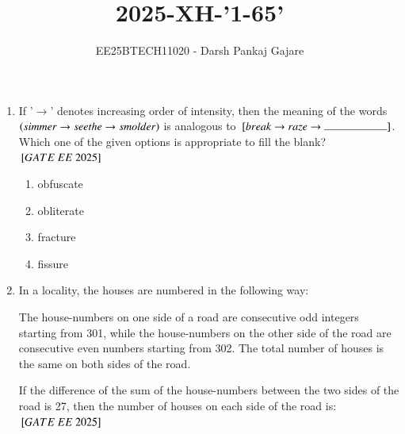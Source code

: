 \documentclass[journal,12pt,onecolumn]{IEEEtran}
\theoremstyle{remark}
\begin{document}
\title{2025-XH-'1-65'}
\author{EE25BTECH11020 - Darsh Pankaj Gajare}
\maketitle
\begin{enumerate}

\item If '$\rightarrow $' denotes increasing order of intensity, then the meaning of the words $\left(simmer \rightarrow  seethe \rightarrow  smolder\right)$ is analogous to $\sbrak{break \rightarrow  raze \rightarrow  \rule{2cm}{0.4pt} }$. Which one of the given options is appropriate to fill the blank? 
${}\left[GATE\ EE\ 2025\right]$\\
    \begin{enumerate}[label=(\Alph*)]
  \item obfuscate \\   
  \item obliterate \\
 \item fracture\\
  \item fissure \\  
  \end{enumerate}
   \item In a locality, the houses are numbered in the following way:

The house-numbers on one side of a road are consecutive odd integers starting from 301, while the house-numbers on the other side of the road are consecutive even numbers starting from 302. The total number of houses is the same on both sides of the road.

If the difference of the sum of the house-numbers between the two sides of the road is 27, then the number of houses on each side of the road is: \\
   ${}\left[GATE\ EE\ 2025\right]$ \\
       \begin{enumerate}[label=(\Alph*)]


\end{enumerate}
\end{enumerate}
\end{document}
